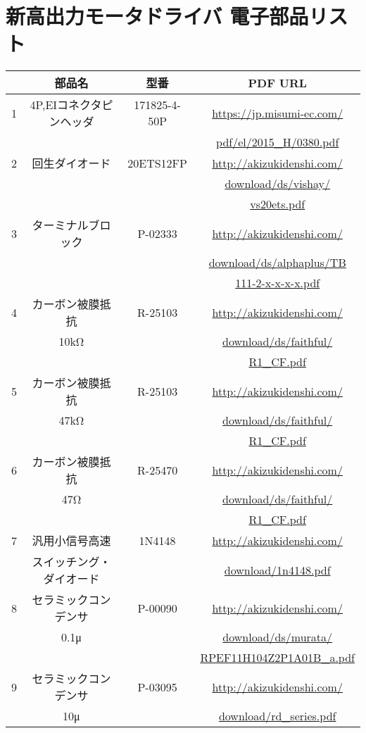 \chapter{新高出力モータドライバ 電子部品リスト}
\begin{tabular}{|c|c|c|c|} \hline
 &部品名&型番&PDF URL\\ \hline
 1&4P,EIコネクタピンヘッダ&171825-4-50P&\url{https://jp.misumi-ec.com/}\\
 &                       &            &\url{pdf/el/2015_H/0380.pdf}\\ \hline
2&回生ダイオード&20ETS12FP&\url{http://akizukidenshi.com/}\\
 &              &         &\url{download/ds/vishay/}\\
 &              &         &\url{vs20ets.pdf}\\ \hline
3&ターミナルブロック&P-02333&\url{http://akizukidenshi.com/}\\
 &                  &       &\url{download/ds/alphaplus/TB}\\
 &                  &       &\url{111-2-x-x-x-x.pdf}\\ \hline
4&カーボン被膜抵抗&R-25103&\url{http://akizukidenshi.com/}\\
 &10kΩ&       &\url{download/ds/faithful/}\\
 &     &       &\url{R1_CF.pdf}\\ \hline
5&カーボン被膜抵抗&R-25103&\url{http://akizukidenshi.com/}\\
 &47kΩ&       &\url{download/ds/faithful/}\\
 &     &       &\url{R1_CF.pdf}\\ \hline
6&カーボン被膜抵抗&R-25470&\url{http://akizukidenshi.com/}\\
 &47Ω&       &\url{download/ds/faithful/}\\
 &    &       &\url{R1_CF.pdf}\\ \hline
7&汎用小信号高速&1N4148&\url{http://akizukidenshi.com/}\\
 &スイッチング・ダイオード&      &\url{download/1n4148.pdf}\\ \hline
8&セラミックコンデンサ&P-00090&\url{http://akizukidenshi.com/}\\
 &0.1μ&       &\url{download/ds/murata/}\\
 &     &       &\url{RPEF11H104Z2P1A01B_a.pdf}\\ \hline
9&セラミックコンデンサ&P-03095&\url{http://akizukidenshi.com/}\\
 &10μ&        &\url{download/rd_series.pdf}\\ \hline
\end{tabular}
